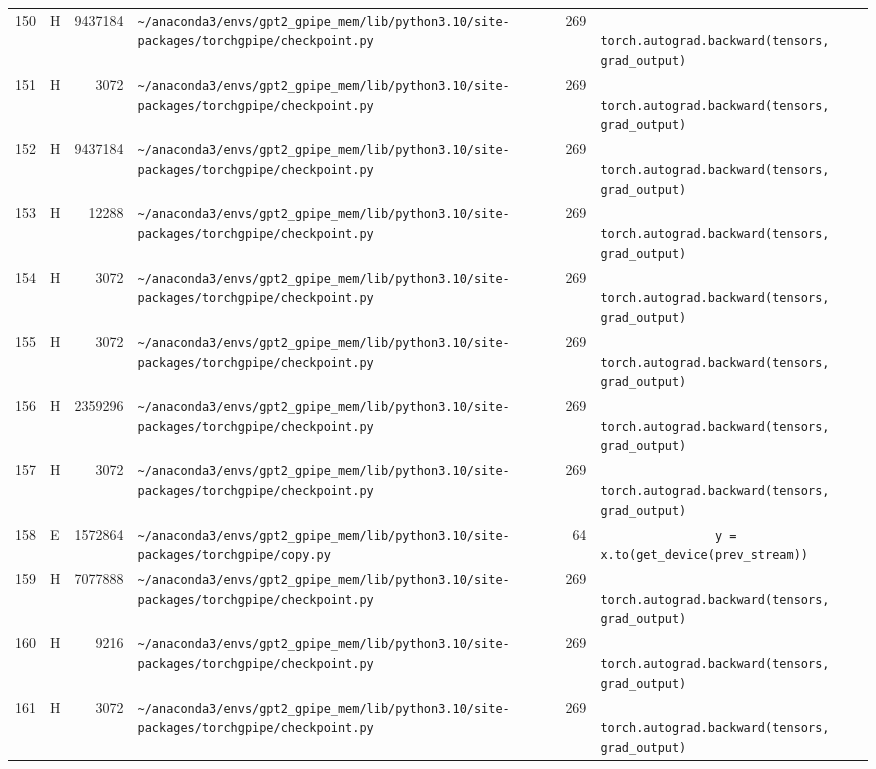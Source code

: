 \documentclass{article}
\begin{document}
\begin{longtable}{r l r p{6.5cm} r p{7.0cm}}
150 & H & 9437184 & \lstinline|~/anaconda3/envs/gpt2_gpipe_mem/lib/python3.10/site-packages/torchgpipe/checkpoint.py| & 269 & \lstinline|            torch.autograd.backward(tensors, grad_output)| \\
151 & H & 3072 & \lstinline|~/anaconda3/envs/gpt2_gpipe_mem/lib/python3.10/site-packages/torchgpipe/checkpoint.py| & 269 & \lstinline|            torch.autograd.backward(tensors, grad_output)| \\
152 & H & 9437184 & \lstinline|~/anaconda3/envs/gpt2_gpipe_mem/lib/python3.10/site-packages/torchgpipe/checkpoint.py| & 269 & \lstinline|            torch.autograd.backward(tensors, grad_output)| \\
153 & H & 12288 & \lstinline|~/anaconda3/envs/gpt2_gpipe_mem/lib/python3.10/site-packages/torchgpipe/checkpoint.py| & 269 & \lstinline|            torch.autograd.backward(tensors, grad_output)| \\
154 & H & 3072 & \lstinline|~/anaconda3/envs/gpt2_gpipe_mem/lib/python3.10/site-packages/torchgpipe/checkpoint.py| & 269 & \lstinline|            torch.autograd.backward(tensors, grad_output)| \\
155 & H & 3072 & \lstinline|~/anaconda3/envs/gpt2_gpipe_mem/lib/python3.10/site-packages/torchgpipe/checkpoint.py| & 269 & \lstinline|            torch.autograd.backward(tensors, grad_output)| \\
156 & H & 2359296 & \lstinline|~/anaconda3/envs/gpt2_gpipe_mem/lib/python3.10/site-packages/torchgpipe/checkpoint.py| & 269 & \lstinline|            torch.autograd.backward(tensors, grad_output)| \\
157 & H & 3072 & \lstinline|~/anaconda3/envs/gpt2_gpipe_mem/lib/python3.10/site-packages/torchgpipe/checkpoint.py| & 269 & \lstinline|            torch.autograd.backward(tensors, grad_output)| \\
158 & E & 1572864 & \lstinline|~/anaconda3/envs/gpt2_gpipe_mem/lib/python3.10/site-packages/torchgpipe/copy.py| & 64 & \lstinline|                y = x.to(get_device(prev_stream))| \\
159 & H & 7077888 & \lstinline|~/anaconda3/envs/gpt2_gpipe_mem/lib/python3.10/site-packages/torchgpipe/checkpoint.py| & 269 & \lstinline|            torch.autograd.backward(tensors, grad_output)| \\
160 & H & 9216 & \lstinline|~/anaconda3/envs/gpt2_gpipe_mem/lib/python3.10/site-packages/torchgpipe/checkpoint.py| & 269 & \lstinline|            torch.autograd.backward(tensors, grad_output)| \\
161 & H & 3072 & \lstinline|~/anaconda3/envs/gpt2_gpipe_mem/lib/python3.10/site-packages/torchgpipe/checkpoint.py| & 269 & \lstinline|            torch.autograd.backward(tensors, grad_output)| \\

\end{longtable}
\end{document}
